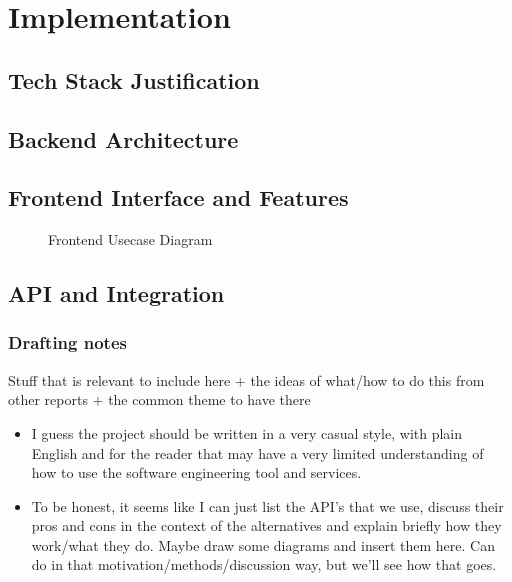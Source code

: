 \chapter{Implementation}
\section{Tech Stack Justification}
\section{Backend Architecture}
\section{Frontend Interface and Features}

\begin{figure}[h]
    \centering
    \caption{Frontend Usecase Diagram}
    \label{fig:frontend_usecase}
\end{figure}

\section{API and Integration}
\subsection{Drafting notes}

Stuff that is relevant to include here + the ideas of what/how to do this from other reports + the common theme to have there
\begin{itemize}
    \item I guess the project should be written in a very casual style, with plain English and for the reader that may have a very limited understanding of how to use the software engineering tool and services.
    \item To be honest, it seems like I can just list the API's that we use, discuss their pros and cons in the context of the alternatives and explain briefly how they work/what they do. Maybe draw some diagrams and insert them here. Can do in that motivation/methods/discussion way, but we'll see how that goes.
\end{itemize}

